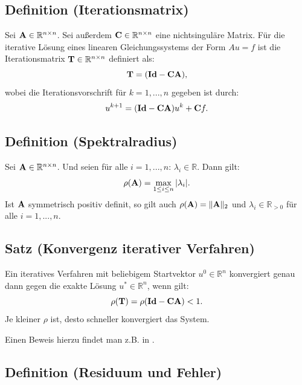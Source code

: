 \subsection{Definition (Iterationsmatrix)}\label{ss.Iterationsmatrix}

Sei ${\textbf{A}} \in \mathbb{R}^{n \times n}$. Sei außerdem ${\textbf{C}} \in \mathbb{R}^{n \times n}$ eine nichtsinguläre Matrix. Für die iterative Lösung eines linearen Gleichungssystems der Form $Au = f$ ist die Iterationsmatrix ${\textbf{T}} \in \mathbb{R}^{n \times n}$ definiert als:
\begin{equation}
{\textbf{T}} = ({\textbf{Id}} - {\textbf{C}} {\textbf{A}}),
\end{equation}
wobei die Iterationsvorschrift für $k=1,...,n$ gegeben ist durch:
\begin{equation}
u^{k+1} = ({\textbf{Id}} - {\textbf{C}} {\textbf{A}})u^{k} + {\textbf{C}} f.\label{eq.Iteratives Verfahren}
\end{equation}

\subsection{Definition (Spektralradius)}\label{s.Spektralradius}

Sei ${\textbf{A}} \in \mathbb{R}^{n \times n}$. Und seien für alle $i=1,...,n$: $\lambda_{i} \in \mathbb{R}$. Dann gilt:
\begin{equation}
\rho({\textbf{A}}) = \max_{1 \le i \le n} | \lambda_{i} |.
\end{equation}
Ist ${\textbf{A}}$ symmetrisch positiv definit, so gilt auch $\rho({\textbf{A}}) = \| {\textbf{A}} \|_{2}$ und $\lambda_{i} \in \mathbb{R}_{>0}$ für alle $i=1,...,n$.

\subsection{Satz (Konvergenz iterativer Verfahren)}\label{ss.Konvergenz iterativer Verfahren}

Ein iteratives Verfahren mit beliebigem Startvektor $u^{0} \in \mathbb{R}^{n}$ konvergiert genau dann gegen die exakte Lösung $u^{*} \in \mathbb{R}^{n}$, wenn gilt:
\begin{equation}
\rho({\textbf{T}}) = \rho({\textbf{Id}} - {\textbf{C}} {\textbf{A}}) < 1.
\end{equation}
Je kleiner $\rho$ ist, desto schneller konvergiert das System.

Einen Beweis hierzu findet man z.B. in \cite{DR5}.

\subsection{Definition (Residuum und Fehler)}\label{ss.Residuum und Fehler}

